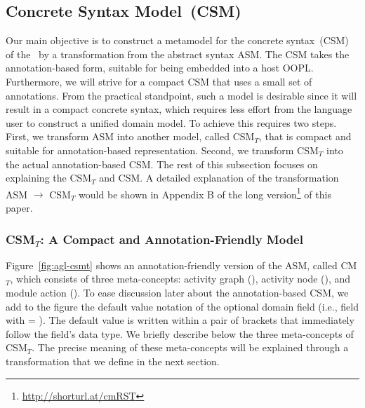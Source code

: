 \subsection{Concrete Syntax Model~(CSM)} \label{sect:agl-asm}

Our main objective is to construct a metamodel for the concrete syntax~(CSM) of the \agl~by a transformation from the abstract syntax ASM. The CSM takes the annotation-based form, suitable for being embedded into a host OOPL. Furthermore, we will strive for a compact CSM that uses a small set of annotations. From the practical standpoint, such a model is desirable since it will result in a compact concrete syntax, which requires less effort from the language user to construct a unified domain model. To achieve this requires two steps. First, we transform ASM into another model, called CSM$_T$, that is compact and suitable for annotation-based representation. Second, we transform CSM$_T$ into the actual annotation-based CSM.
%
The rest of this subsection focuses on explaining the CSM$_T$ and CSM. A detailed explanation of the transformation ASM $\rightarrow$ CSM$_T$ would be shown in Appendix B of the long version\footnote{\url{http://shorturl.at/cmRST}} of this paper. 

\subsubsection{CSM$_T$: A Compact and Annotation-Friendly Model}
%
Figure~\ref{fig:agl-csmt} shows an annotation-friendly version of the ASM, called CM$_T$, which consists of three meta-concepts: activity graph (), activity node (), and module action (). To ease discussion later about the annotation-based CSM, we add to the figure the default value notation of the optional domain field (i.e., field with  = ). The default value is written within a pair of brackets that immediately follow the field's data type.
%
We briefly describe below the three meta-concepts of CSM$_T$. The precise meaning of these meta-concepts will be explained through a transformation that we define in the next section. 

